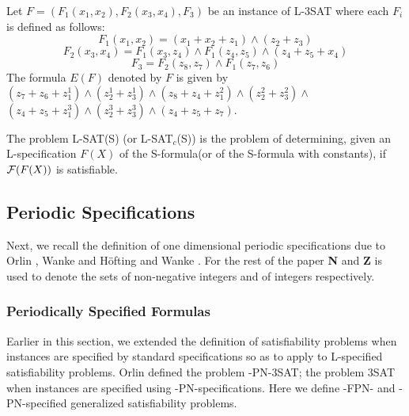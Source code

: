 \begin{example}
Let $F= (F_1(x_1,x_2),F_{2}(x_3,x_4), F_3)$
be an instance of {\sf L-3SAT} where each $F_i$ is defined as follows:
\[F_1(x_1,x_2) = (x_1 + x_2 + z_1) \wedge (z_2 + z_3) \]
\[F_2(x_3,x_4) = F_1(x_3, z_4) \wedge F_1(z_4, z_5) \wedge
                               (z_4 + z_5 + x_4)   \]
\[F_3 = F_2(z_8,z_7) \wedge  F_1(z_7,z_6) \]
The formula $E(F)$ denoted by $F$ is given by 
$ (z_7 + z_6 + z_1^1) \wedge (z_2^1 + z_3^1) \wedge
(z_8 + z_4 + z_1^2) \wedge (z_2^2 + z_3^2) \wedge $
$(z_4 + z_5 + z_1^3) \wedge (z_2^3 + z_3^3) \wedge (z_4 + z_5 + z_7)$. 

\end{example}


\begin{definition}
The problem {\sf L-SAT(S)} (or {\sf L-SAT}$_c${\sf (S)}) is the
problem of determining, given an L-specification $F(X)$ of the S-formula(or of
the S-formula with constants), if ${\cal F}(F(X))$ is satisfiable.
\end{definition}
 






\vspace*{-0.15in}
\subsection{Periodic Specifications }\label{sec:fpn_spec}
Next, we recall the definition of one dimensional periodic specifications 
due to  Orlin \cite{Or82a}, Wanke \cite{Wa93} and 
H\"ofting and Wanke \cite{HW92}. 
For the rest of the paper {\bf N} and {\bf Z} is used to 
denote the sets of non-negative integers and of integers respectively.



\vspace*{-0.15in}
\subsubsection{Periodically Specified Formulas}
Earlier in this section, we extended
the definition of satisfiability problems when instances are specified
by standard specifications so as to apply to 
{\sf L}-specified satisfiability problems. Orlin \cite{Or82a} 
defined the problem {-PN-3SAT}; the problem {\sf 3SAT} when 
instances are specified using {-PN}-specifications.
Here we define {-FPN}- and {-PN}-specified generalized satisfiability
problems.




